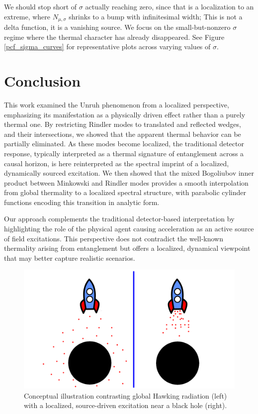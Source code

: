 \documentclass[12pt,a4paper]{article}
\begin{document}
We should stop short of $\sigma$ actually reaching zero, since that is a localization to an extreme, where $N_{\mu,\sigma}$ shrinks to a bump with infinitesimal width; This is not a delta function, it is a vanishing source. We focus on the small-but-nonzero $\sigma$ regime where the thermal character has already disappeared. See Figure \ref{pcf_sigma_curves} for representative plots across varying values of $\sigma$.


\section{Conclusion}

This work examined the Unruh phenomenon from a localized perspective, emphasizing its manifestation as a physically driven effect rather than a purely thermal one. By restricting Rindler modes to translated and reflected wedges, and their intersections, we showed that the apparent thermal behavior can be partially eliminated. As these modes become localized, the traditional detector response, typically interpreted as a thermal signature of entanglement across a causal horizon, is here reinterpreted as the spectral imprint of a localized, dynamically sourced excitation. We then showed that the mixed Bogoliubov inner product between Minkowski and Rindler modes provides a smooth interpolation from global thermality to a localized spectral structure, with parabolic cylinder functions encoding this transition in analytic form.

Our approach complements the traditional detector-based interpretation by highlighting the role of the physical agent causing acceleration as an active source of field excitations. This perspective does not contradict the well-known thermality arising from entanglement but offers a localized, dynamical viewpoint that may better capture realistic scenarios.

\begin{figure}[h]
\centering
\includegraphics[scale=0.5]{rocket.png}
\caption{Conceptual illustration contrasting global Hawking radiation (left) with a localized, source-driven excitation near a black hole (right).}
\label{rocket}
\end{figure}
\end{document}
